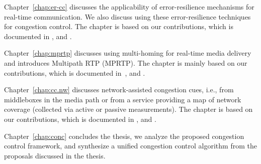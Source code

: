 Chapter~\ref{chap:er-cc} discusses the applicability of error-resilience
mechanisms for real-time communication. We also discuss using these
error-resilience techniques for congestion control. The chapter is based on
our contributions, which is documented in , and
.


Chapter~\ref{chap:mprtp} discusses using multi-homing for real-time media
delivery and introduces Multipath RTP (MPRTP). The chapter is mainly based on
our contributions, which is documented in~\cite{draft.mprtp, draft.mprtp.sdp,
Globisch:AsymGrpComm, draft.rtcp.overlay}, and .



Chapter~\ref{chap:cc.nw} discusses network-assisted congestion cues, i.e.,
from middleboxes in the media path or from a service providing a map of
network coverage (collected via active or passive measurements). The chapter
is based on our contributions, which is documented in ,
 and \cite{glass:patent}.


Chapter~\ref{chap:conc} concludes the thesis, we analyze the proposed
congestion control framework, and synthesize a unified congestion control
algorithm from the proposals discussed in the thesis.
